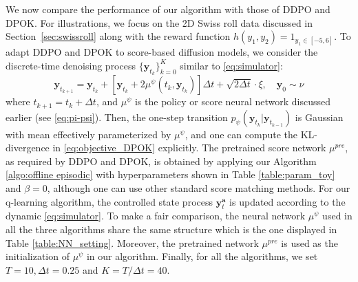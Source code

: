 \documentclass[11pt]{article}
\begin{document}
We now compare the performance of our algorithm with those of DDPO and DPOK. For illustrations, we focus on the 2D Swiss roll data discussed in Section~\ref{sec:swissroll} along with the reward function $h(y_1, y_2) = 1_{y_1\in[-5, 6]}$.
To adapt DDPO and DPOK to score-based diffusion models,
we consider the discrete-time denoising process $\{\mathbf{y}_{t_k}\}_{k=0}^{K}$ similar to \eqref{eq:simulator}:
\begin{equation*}
    \mathbf{y}_{t_{k + 1}} = \mathbf{y}_{t_k} + \left[\mathbf{y}_{t_k} + 2\mu^\psi(t_k, \mathbf{y}_{t_k})\right]\Delta t + \sqrt{2\Delta t}\cdot \xi,\quad \mathbf{y}_{0}\sim \nu
\end{equation*}
where $t_{k + 1} = t_k + \Delta t$, and $\mu^\psi$ is the policy or score neural network discussed earlier (see \eqref{eq:pi-psi}). Then, the one-step transition $p_{\psi}(\mathbf{y}_{t_{k}}| \mathbf{y}_{t_{k - 1}})$ is Gaussian with mean effectively parameterized by $\mu^\psi$, and one can compute the KL-divergence in \eqref{eq:objective_DPOK} explicitly.
The pretrained score network $\mu^{pre}$, as required by DDPO and DPOK, is obtained by applying our Algorithm \ref{algo:offline episodic} with hyperparameters shown in Table \ref{table:param_toy} and $\beta = 0$, although one can use other standard score matching methods. For our q-learning algorithm, the controlled state process $\mathbf{y}_t^{\mathbf{a}}$ is updated according to the dynamic \eqref{eq:simulator}. To make a fair comparison, the neural network $\mu^\psi$ used in all the three algorithms share the same structure which is the one displayed in Table \ref{table:NN_setting}. Moreover,  the pretrained network $\mu^{pre}$ is used as the initialization of $\mu^\psi$ in our algorithm.
Finally, for all the algorithms, we set $T = 10, \Delta t = 0.25$ and $K = T / \Delta t = 40$.
\end{document}
